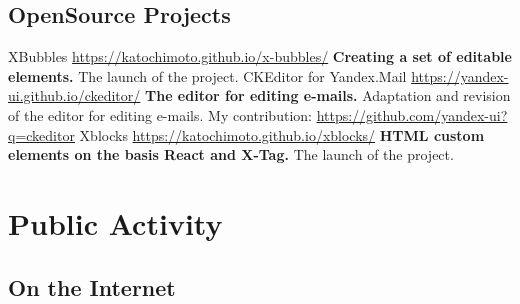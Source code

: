\documentclass[11pt,a4paper]{moderncv}
\begin{document}
  \subsection{OpenSource Projects}
  \cvline
    {XBubbles}
    {\url{https://katochimoto.github.io/x-bubbles/}\newline{}
    \textbf{Creating a set of editable elements.}\newline{}
    The launch of the project.}
  \cvline
    {CKEditor for Yandex.Mail}
    {\url{https://yandex-ui.github.io/ckeditor/}\newline{}
    \textbf{The editor for editing e-mails.}\newline{}
    Adaptation and revision of the editor for editing e-mails.\newline{}
    My contribution:\newline{}
    \url{https://github.com/yandex-ui?q=ckeditor}
    }
  \cvline
    {Xblocks}
    {\url{https://katochimoto.github.io/xblocks/}\newline{}
    \textbf{HTML custom elements on the basis React and X-Tag.}\newline{}
    The launch of the project.}

\section{Public Activity}
  \subsection{On the Internet}
\end{document}
